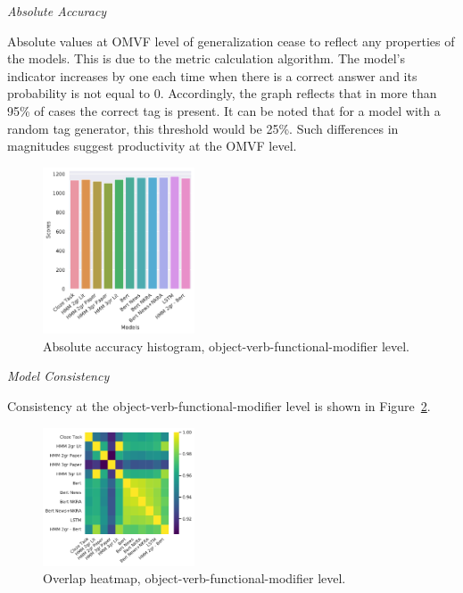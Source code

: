 \documentclass[a4paper]{article}
\newcommand{\head}[1]{\vspace{0.5em}\emph{#1}\vspace{0.25em}}
\begin{document}
\head{Absolute Accuracy}

Absolute values at OMVF level of generalization cease to reflect
any properties of the models. This is due to the metric calculation
algorithm. The model's indicator increases by one each time when there
is a correct answer and its probability is not equal to 0.
Accordingly, the graph reflects that in more than 95\% of cases the
correct tag is present. It can be noted that for a model with a random
tag generator, this threshold would be 25\%. Such differences in magnitudes suggest productivity at the OMVF level. 

\begin{figure}
\caption{Absolute accuracy histogram, object-verb-functional-modifier level.}
\label{fig:abs-accuracy-hist-ovfm}
\centering
\includegraphics[width=0.4\textwidth]{figures/pdf/abs-accuracy-hist-ovfm.pdf}
\end{figure}

\head{Model Consistency}

Consistency at the object-verb-functional-modifier level is shown in
Figure~\ref{fig:heatmap-context-accord-ovfm}.

\begin{figure}
\label{fig:heatmap-context-accord-ovfm}
\caption{Overlap heatmap, object-verb-functional-modifier level.}
\centering
\includegraphics[width=0.4\textwidth]{figures/pdf/heatmap-context-accord-ovfm.pdf}
\end{figure}
\end{document}
